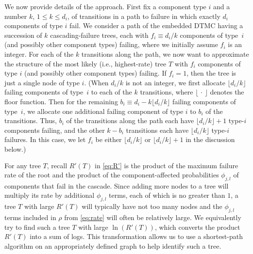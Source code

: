 \documentclass[12pt]{article}
\newcommand{\changed}[1]{#1}
\newcommand{\changed}[1]{\textcolor{red}{#1}}
\begin{document}
\changed{We now provide details
of the approach. First fix a component type $i$ and a number $k$, $1 \leq k
\leq d_{i}$, of transitions in a path to failure in which exactly $d_{i}$
components of type $i$ fail. We consider a path of the embedded DTMC having a
succession of $k$ cascading-failure trees, each with $f_{i} \equiv d_{i}/k$
components of type~$i$ (and possibly other component types) failing, where we
initially assume $f_i$ is an integer. For each of the $k$ transitions along
the path, we now want to approximate the structure of the most likely (i.e.,
highest-rate) tree $T$ with $f_{i}$ components of type $i$ (and possibly other
component types) failing. If $f_i = 1$, then the tree is just a single node of
type $i$. (When $d_{i}/k$ is not an integer, we first allocate $\lfloor
d_{i}/k \rfloor$ failing components of type~$i$ to each of the $k$
transitions, where $\lfloor \, \cdot \, \rfloor$ denotes the floor function.
Then for the remaining $b_{i} \equiv d_{i} - k \lfloor d_{i}/k \rfloor$
failing components of type~$i$, we allocate one additional failing component
of type $i$ to $b_{i}$ of the transitions. Thus, $b_i$ of the transitions
along the path each have $\lfloor d_{i}/k \rfloor + 1$ type-$i$ components
failing, and the other $k - b_i$ transitions each have $\lfloor d_{i}/k
\rfloor$ type-$i$ failures. In this case, we let $f_{i}$ be either $\lfloor
d_{i}/k \rfloor$ or $\lfloor d_{i}/k \rfloor + 1$ in the discussion below.)}

\changed{For any tree $T$, recall $R'(T)$ in \eqref{eq:R'} is the product of
the maximum failure rate of the root and the product of the component-affected
probabilities $\phi_{j,l}$ of components that fail in the cascade.
Since adding more nodes to a tree will multiply its rate by additional
$\phi_{j,l}$ terms, each of which is no greater than $1$, a tree $T$ with
large $R'(T)$ will typically have not too many nodes and the $\phi_{j,l}$
terms} included in $\rho$ from \eqref{eq:rate} will often be relatively large.
We equivalently try to find such a tree $T$ with large $\ln(R'(T))$, which
converts the product $R'(T)$ into a sum of logs.
\changed{This transformation allows us to
use} a shortest-path algorithm on an appropriately defined graph to help
identify such a tree.
\end{document}
